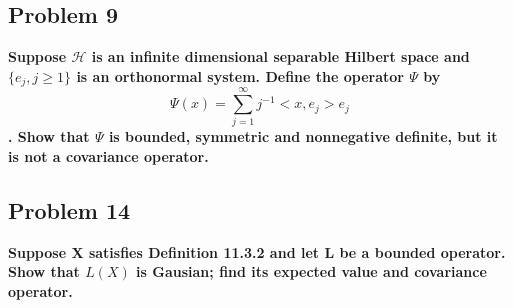 \documentclass{article}
\begin{document}
\subsection{Problem 9}
\textbf{
    Suppose $\mathcal{H}$ is an infinite dimensional separable Hilbert space and $\{e_j,j\geq1\}$ is an orthonormal system.
    Define the operator $\Psi$ by
    \[\Psi(x)=\sum_{j=1}^{\infty}j^{-1}<x,e_j>e_j\].
    Show that $\Psi$ is bounded, symmetric and nonnegative definite, but it is not a covariance operator.
}

\subsection{Problem 14}
\textbf{
    Suppose X satisfies Definition 11.3.2 and let L be a bounded operator. 
    Show that $L(X)$ is Gausian; find its expected value and covariance operator.
}
\end{document}
